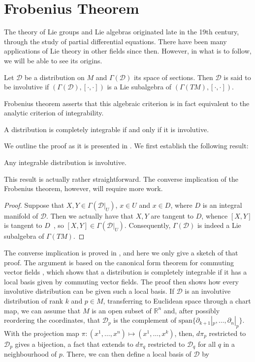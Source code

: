 \section{Frobenius Theorem}

The theory of Lie groups and Lie algebras originated late in the 19th century, through the study of partial differential equations. There have been many applications of Lie theory in other fields since then. However, in what is to follow, we will be able to see its origins.
\begin{definition}
  Let $\mathcal{D}$ be a distribution on $M$ and $\Gamma(\mathcal{D})$ its space of sections. Then $\mathcal{D}$ is said to be involutive if $(\Gamma(\mathcal{D}),[\cdot,\cdot])$ is a Lie subalgebra of $(\Gamma(TM),[\cdot,\cdot])$.
\end{definition}
Frobenius theorem asserts that this algebraic criterion is in fact equivalent to the analytic criterion of integrability.
\begin{theorem}
  A distribution is completely integrable if and only if it is involutive.
\end{theorem}
We outline the proof as it is presented in \cite{book:lee}. We first establish the following result:
\begin{proposition}
  Any integrable distribution is involutive.
\end{proposition}
This result is actually rather straightforward. The converse implication of the Frobenius theorem, however, will require more work.
\begin{proof}
  Suppose that $X,Y\in\Gamma(\mathcal{D}|_U)$, $x\in U$ and $x\in D$, where $D$ is an integral manifold of $\mathcal{D}$. Then we actually have that $X,Y$ are tangent to $D$, whence $[X,Y]$ is tangent to $D$~\cite[Corollary 8.32]{book:lee}, so $[X,Y]\in\Gamma(\mathcal{D}|_U)$. Consequently, $\Gamma(\mathcal{D})$ is indeed a Lie subalgebra of $\Gamma(TM)$.
\end{proof}
The converse implication is proved in \cite[Theorem 19.12]{book:lee}, and here we only give a sketch of that proof. The argument is based on the canonical form theorem for commuting vector fields \cite[Theorem 9.46]{book:lee}, which shows that a distribution is completely integrable if it has a local basis given by commuting vector fields. The proof then shows how every involutive distribution can be given such a local basis.
If $\mathcal{D}$ is an involutive distribution of rank $k$ and $p\in M$, transferring to Euclidean space through a chart map, we can assume that $M$ is an open subset of $\mathbb{R}^n$ and, after possibly reordering the coordinates, that $\mathcal{D}_p$ is the complement of $\text{span}\{\partial_{k+1}|_p,\dots,\partial_n|_p\}$. With the projection map $\pi:(x^1,\dots,x^n)\mapsto (x^1,\dots, x^k)$, then, $d\pi_p$ restricted to $\mathcal{D}_p$ gives a bijection, a fact that extends to $d\pi_q$ restricted to $\mathcal{D}_q$ for all $q$ in a neighbourhood of $p$. There, we can then define a local basis of $\mathcal{D}$ by
